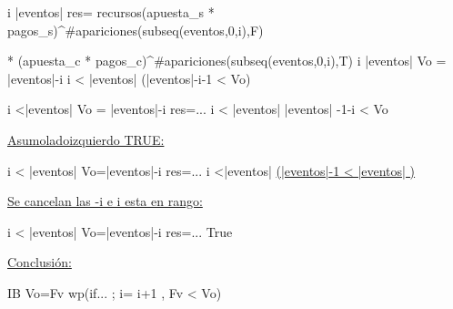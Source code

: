 \vspace{0.3cm}

\leq i \leq |eventos| \yLuego res= recursos(apuesta_s * pagos_s)^{\#apariciones(subseq(eventos,0,i),F)}

\vspace{0.2cm}
*\phantom{.} (apuesta_c * pagos_c)^{\#apariciones(subseq(eventos,0,i),T)} \wedge i \in |eventos| \wedge Vo = |eventos|-i \leq i < |eventos| \yLuego \phantom{...}\hspace{17}  
(|eventos|-i-1 < Vo)



\vspace{0.3cm}

\leq i <|eventos| \wedge Vo = |eventos|-i \wedge res=... \leq i < |eventos| \wedge |eventos| -1-i < Vo

\vspace{0.3cm}

\underline{Asumo\hspace{3}lado\hspace{3}izquierdo\hspace{3} TRUE:}

\vspace{0.3cm}

\leq i < |eventos| \wedge Vo=|eventos|-i \wedge res=... \leq i <|eventos| \wedge \underline{(|eventos|-1  < |eventos| )} 

\vspace{0.3cm}

\underline{Se cancelan las -i e i esta en rango:}

\vspace{0.3cm}


\leq i < |eventos| \wedge Vo=|eventos|-i \wedge res=... \rightarrow True

\vspace{0.3cm}

\underline{Conclusi\'on:}
\vspace{0.2cm}

I\wedge B \wedge Vo=Fv \rightarrow wp(if... ; i= i+1 , Fv < Vo)


